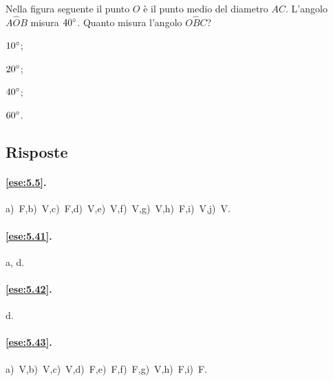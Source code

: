 \noindent\begin{minipage}{0.65\textwidth}\parindent15pt
\begin{esercizio}
\label{ese:5.68}
Nella figura seguente il punto $O$ è il punto medio del diametro $AC$. L'angolo $A\widehat{O}B$ misura $40{}^{\circ}$. Quanto misura l'angolo $O\widehat{B}C$? 
\begin{multicols}{4}
\begin{enumeratea}
\item $10{}^{\circ}$;
\item $20{}^{\circ}$;
\item $40{}^{\circ}$;
\item $60{}^{\circ}$.
\end{enumeratea}
\end{multicols}
\end{esercizio}
\end{minipage}\hfil
\begin{minipage}{0.35\textwidth}
	\centering
\end{minipage}\vspace{5pt}


\subsection{Risposte}

\begingroup
\hypersetup{linkcolor=black}

\paragraph{\ref{ese:5.5}.}
a)~F,\quad b)~V,\quad c)~F,\quad d)~V,\quad e)~V,\quad f)~V,\quad g)~V,\quad h)~F,\quad i)~V,\quad j)~V.

\paragraph{\ref{ese:5.41}.}
a, d.

\paragraph{\ref{ese:5.42}.}
d.

\paragraph{\ref{ese:5.43}.}
a)~V,\quad b)~V,\quad c)~V,\quad d)~F,\quad e)~F,\quad f)~F,\quad g)~V,\quad h)~F,\quad i)~F.

